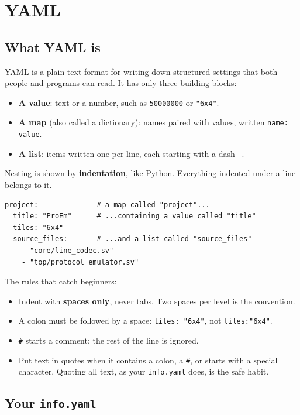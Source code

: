 \documentclass[11pt,a4paper]{article}
\newcommand{\file}[1]{\texttt{#1}}
\begin{document}
\section{YAML}\label{sec:yaml}

\subsection{What YAML is}

YAML is a plain-text format for writing down structured settings that both people and programs can read. It has only three building blocks:

\begin{itemize}
\item \textbf{A value}: text or a number, such as \texttt{50000000} or \texttt{"6x4"}.
\item \textbf{A map} (also called a dictionary): names paired with values, written \texttt{name: value}.
\item \textbf{A list}: items written one per line, each starting with a dash \texttt{-}.
\end{itemize}

Nesting is shown by \textbf{indentation}, like Python. Everything indented under a line belongs to it.

\begin{lstlisting}
project:              # a map called "project"...
  title: "ProEm"      # ...containing a value called "title"
  tiles: "6x4"
  source_files:       # ...and a list called "source_files"
    - "core/line_codec.sv"
    - "top/protocol_emulator.sv"
\end{lstlisting}

The rules that catch beginners:
\begin{itemize}
\item Indent with \textbf{spaces only}, never tabs. Two spaces per level is the convention.
\item A colon must be followed by a space: \texttt{tiles: "6x4"}, not \texttt{tiles:"6x4"}.
\item \texttt{\#} starts a comment; the rest of the line is ignored.
\item Put text in quotes when it contains a colon, a \texttt{\#}, or starts with a special character. Quoting all text, as your \file{info.yaml} does, is the safe habit.
\end{itemize}

\subsection{Your \file{info.yaml}}
\end{document}
